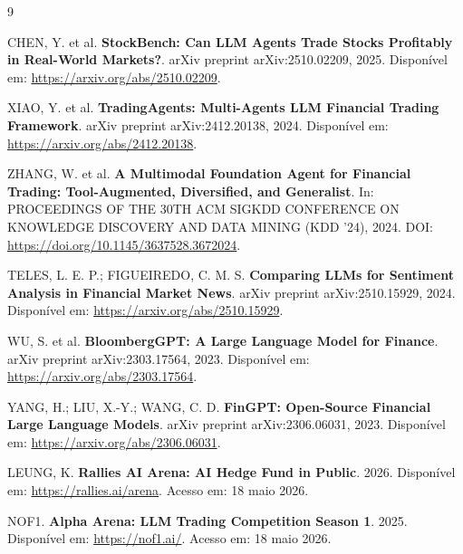 \documentclass[portuguese]{sbcreviews-2025}
\begin{document}
\begin{thebibliography}{9}

CHEN, Y. et al. \textbf{StockBench: Can LLM Agents Trade Stocks Profitably in Real-World Markets?}. arXiv preprint arXiv:2510.02209, 2025. Disponível em: \url{https://arxiv.org/abs/2510.02209}.

XIAO, Y. et al. \textbf{TradingAgents: Multi-Agents LLM Financial Trading Framework}. arXiv preprint arXiv:2412.20138, 2024. Disponível em: \url{https://arxiv.org/abs/2412.20138}.

ZHANG, W. et al. \textbf{A Multimodal Foundation Agent for Financial Trading: Tool-Augmented, Diversified, and Generalist}. In: PROCEEDINGS OF THE 30TH ACM SIGKDD CONFERENCE ON KNOWLEDGE DISCOVERY AND DATA MINING (KDD '24), 2024. DOI: \url{https://doi.org/10.1145/3637528.3672024}.

TELES, L. E. P.; FIGUEIREDO, C. M. S. \textbf{Comparing LLMs for Sentiment Analysis in Financial Market News}. arXiv preprint arXiv:2510.15929, 2024. Disponível em: \url{https://arxiv.org/abs/2510.15929}.

WU, S. et al. \textbf{BloombergGPT: A Large Language Model for Finance}. arXiv preprint arXiv:2303.17564, 2023. Disponível em: \url{https://arxiv.org/abs/2303.17564}.

YANG, H.; LIU, X.-Y.; WANG, C. D. \textbf{FinGPT: Open-Source Financial Large Language Models}. arXiv preprint arXiv:2306.06031, 2023. Disponível em: \url{https://arxiv.org/abs/2306.06031}.

LEUNG, K. \textbf{Rallies AI Arena: AI Hedge Fund in Public}. 2026. Disponível em: \url{https://rallies.ai/arena}. Acesso em: 18 maio 2026.

NOF1. \textbf{Alpha Arena: LLM Trading Competition Season 1}. 2025. Disponível em: \url{https://nof1.ai/}. Acesso em: 18 maio 2026.

\end{thebibliography}
\end{document}
